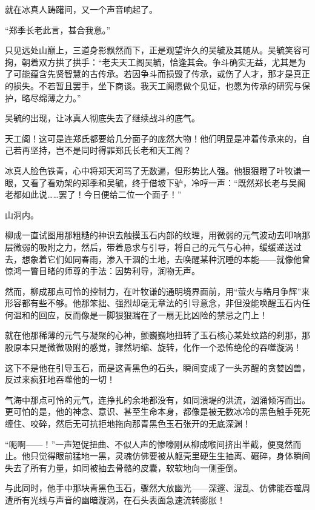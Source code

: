 就在冰真人踌躇间，又一个声音响起了。

“郑季长老此言，甚合我意。”

只见远处山巅上，三道身影飘然而下，正是观望许久的吴毓及其随从。吴毓笑容可掬，朝着双方拱了拱手：“老夫天工阁吴毓，恰逢其会。争斗确实无益，尤其是为了可能蕴含先贤智慧的古传承。若因争斗而损毁了传承，或伤了人才，那才是真正的损失。不若暂且罢手，坐下商谈。我天工阁愿做个见证，也愿为传承的研究与保护，略尽绵薄之力。”

吴毓的出现，让冰真人彻底失去了继续战斗的底气。

天工阁！这可是连郑氏都要给几分面子的庞然大物！他们明显是冲着传承来的，自己若再坚持，岂不是同时得罪郑氏长老和天工阁？

冰真人脸色铁青，心中将郑天河骂了无数遍，但形势比人强。他狠狠瞪了叶牧谦一眼，又看了看劝架的郑季和吴毓，终于借坡下驴，冷哼一声：“既然郑长老与吴阁老都如此说……罢了！今日便给二位一个面子！”

\vspace{2em}

山洞内。

柳成一直试图用那粗糙的神识去触摸玉石内部的纹理，用微弱的元气波动去叩响那层微弱的吸附之力，然后，带着恳求与引导，将自己的元气与心神，缓缓递送过去，想象着它们如同春雨，渗入干涸的土地，去唤醒某种沉睡的本能——就像他曾惊鸿一瞥目睹的师尊的手法：因势利导，润物无声。

然而，柳成那点可怜的控制力，在叶牧谦的通明境界面前，用“萤火与皓月争辉”来形容都有些不够。他那笨拙、强烈却毫无章法的引导意念，非但没能唤醒玉石内任何温和的回应，反而像是一脚狠狠踹在了一扇无比凶险的禁忌之门上！

就在他那稀薄的元气与凝聚的心神，颤巍巍地扭转了玉石核心某处纹路的刹那，那股原本只是微微吸附的感觉，骤然坍缩、旋转，化作一个恐怖绝伦的吞噬漩涡！

这下不是他在引导玉石，而是这青黑色的石头，瞬间变成了一头苏醒的贪婪凶兽，反过来疯狂地吞噬他的一切！

气海中那点可怜的元气，连挣扎的余地都没有，如同溃堤的洪流，汹涌倾泻而出。更可怕的是，他的神念、意识、甚至生命本身，都像是被无数冰冷的黑色触手死死缠住、咬碎，然后无可抗拒地拖向那青黑色玉石张开的无底深渊！

“呃啊——！”一声短促扭曲、不似人声的惨嚎刚从柳成喉间挤出半截，便戛然而止。他只觉得眼前猛地一黑，灵魂仿佛要被从躯壳里硬生生抽离、碾碎，身体瞬间失去了所有力量，如同被抽去骨骼的皮囊，软软地向一侧歪倒。

与此同时，他手中那块青黑色玉石，骤然大放幽光——深邃、混乱、仿佛能吞噬周遭所有光线与声音的幽暗漩涡，在石头表面急速流转膨胀！

